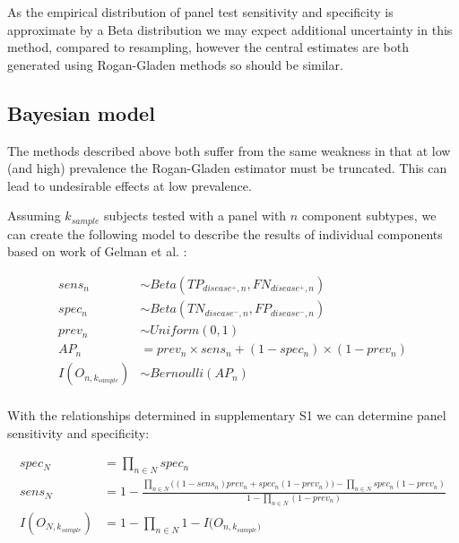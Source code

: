 \documentclass[a4paper, 12pt, twoside]{article}
\let\Oldsubsection\subsection
\renewcommand{\subsection}{\FloatBarrier\Oldsubsection}
\begin{document}
As the empirical distribution of panel test sensitivity and specificity is approximate by a Beta distribution we may expect additional uncertainty in this method, compared to resampling, however the central estimates are both generated using Rogan-Gladen methods so should be similar.

\subsection{Bayesian model}

The methods described above both suffer from the same weakness in that at low (and high) prevalence the Rogan-Gladen estimator must be truncated. This can lead to undesirable effects at low prevalence.

Assuming \(k_{sample}\) subjects tested with a panel with \(n\) component subtypes, we can create the following model to describe the results of individual components based on work of Gelman et al. \cite{gelman2020}:

\begin{equation*}
\begin{aligned}
sens_n &\sim Beta(TP_{disease^+,n}, FN_{disease^+,n}) \\
spec_n &\sim Beta(TN_{disease^-,n}, FP_{disease^-,n}) \\
prev_n &\sim Uniform(0,1) \\
AP_n &= prev_n \times sens_n + (1-spec_n) \times (1-prev_n) \\
I(O_{n,k_{sample}}) &\sim Bernoulli(AP_n) \\
\end{aligned}
\end{equation*}

With the relationships determined in supplementary S1 we can determine panel sensitivity and specificity:

\begin{equation*}
\begin{aligned}
spec_N &= \prod_{n \in N}{spec_n} \\
sens_N &= 1-\frac{
  \prod_{n \in N}{\bigg((1-sens_n) prev_n + spec_n  (1-prev_n) \bigg) } - \prod_{n \in N}{spec_n (1-prev_n)}
}{
  1 - \prod_{n \in N}{ (1-prev_n)} %
} \\
I(O_{N,k_{sample}}) &= 1-\prod_{n \in N}{1-I(O_{n,k_{sample})}} \\
\end{aligned}
\end{equation*}
\end{document}

